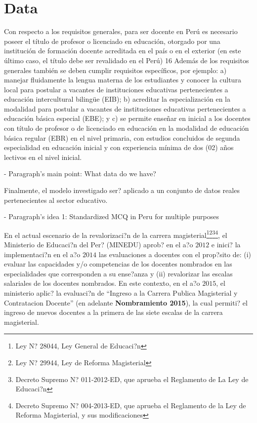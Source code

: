 \section{Data}

Con respecto a los requisitos generales, para ser docente en Perú es necesario poseer el título de profesor o licenciado en educación, otorgado por una institución de formación docente acreditada en el país o en el exterior (en este último caso, el título debe ser revalidado en el Perú) 16 Además de los requisitos generales también se deben cumplir requisitos específicos, por ejemplo: a) manejar fluidamente la lengua materna de los estudiantes y conocer la cultura local para postular a vacantes de instituciones educativas pertenecientes a educación intercultural bilingüe (EIB); b) acreditar la especialización en la modalidad para postular a vacantes de instituciones educativas pertenecientes a educación básica especial (EBE); y c) se permite enseñar en inicial a los docentes con título de profesor o de licenciado en educación en la modalidad de educación básica regular (EBR) en el nivel primaria, con estudios concluidos de segunda especialidad en educación inicial y con experiencia mínima de dos (02) años lectivos en el nivel inicial.


- Paragraph's main point: What data do we have?

Finalmente, el modelo investigado ser? aplicado a un conjunto de datos reales pertenecientes al sector educativo. 


- Paragraph's idea 1: Standardized MCQ in Peru for multiple purposes

En el actual escenario de la revalorizaci?n de la carrera magisterial\footnote{Ley N? 28044, Ley General de Educaci?n}\footnote{Ley N? 29944, Ley de Reforma Magisterial}\footnote{Decreto Supremo N? 011-2012-ED, que aprueba el Reglamento de La Ley de Educaci?n}\footnote{Decreto Supremo N? 004-2013-ED, que aprueba el Reglamento de la Ley de Reforma Magisterial, y sus modificaciones}, el Ministerio de Educaci?n del Per? (MINEDU) aprob? en el a?o $2012$ e inici? la implementaci?n en el a?o $2014$ las evaluaciones a docentes con el prop?sito de: (i) evaluar las capacidades y/o competencias de los docentes nombrados en las especialidades que corresponden a su ense?anza y (ii) revalorizar las escalas salariales de los docentes nombrados. En este contexto, en el a?o $2015$, el ministerio aplic? la evaluaci?n de ``Ingreso a la Carrera Publica Magisterial y Contratacion Docente'' (en adelante \textbf{Nombramiento 2015}), la cual permiti? el ingreso de nuevos docentes a la primera de las siete escalas de la carrera magisterial.


